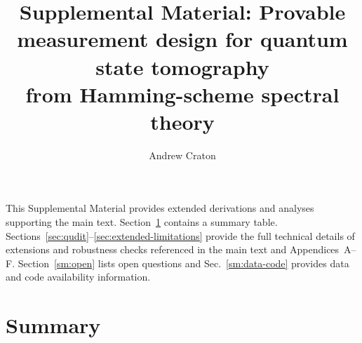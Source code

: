 \documentclass[twocolumn,prx,aps,superscriptaddress,longbibliography]{revtex4-2}
\begin{document}
\title{Supplemental Material: Provable measurement design for quantum state tomography\\
from Hamming-scheme spectral theory}

\author{Andrew Craton}

\maketitle

This Supplemental Material provides extended derivations and analyses
supporting the main text.  Section~\ref{sm:summary} contains a summary table.
Sections~\ref{sec:qudit}--\ref{sec:extended-limitations} provide the
full technical details of extensions and robustness checks referenced
in the main text and Appendices~A--F.
Section~\ref{sm:open} lists open questions and Sec.~\ref{sm:data-code}
provides data and code availability information.

\section{Summary}
\label{sm:summary}
\end{document}
